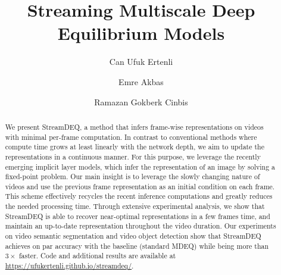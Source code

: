 \documentclass[runningheads]{llncs}
\let\svthefootnote\thefootnote
\newcommand\freefootnote[1]{\let\thefootnote\relax \footnotetext{#1}\let\thefootnote\svthefootnote }
\renewcommand{\thefootnote}{*}
\begin{document}
\pagestyle{headings}
\mainmatter


\title{Streaming Multiscale Deep Equilibrium Models} 




\author{Can Ufuk Ertenli\inst{} \and
Emre Akbas\inst{*} \and
Ramazan Gokberk Cinbis\inst{*}}


\maketitle




\begin{abstract}
We present StreamDEQ, a method that infers frame-wise representations on videos with minimal per-frame computation. In contrast to conventional methods where compute time grows at least linearly with the network depth, we aim to update the representations in a continuous manner. For this purpose, we leverage the recently emerging implicit layer models, which infer the representation of an image by solving a fixed-point problem. Our main insight is to leverage the slowly changing nature of videos and use the previous frame representation as an initial condition on each frame. This scheme effectively recycles the recent inference computations and greatly reduces the needed processing time. Through extensive experimental analysis, we show that StreamDEQ is able to recover near-optimal representations in a few frames time, and maintain an up-to-date representation throughout the video duration. Our experiments on video semantic segmentation and video object detection show that StreamDEQ achieves on par accuracy with the baseline (standard MDEQ) while being more than $3\times$ faster. Code and additional results are available at \url{https://ufukertenli.github.io/streamdeq/}.


\end{abstract}


\freefootnote{To appear at ECCV 2022.}
\end{document}
